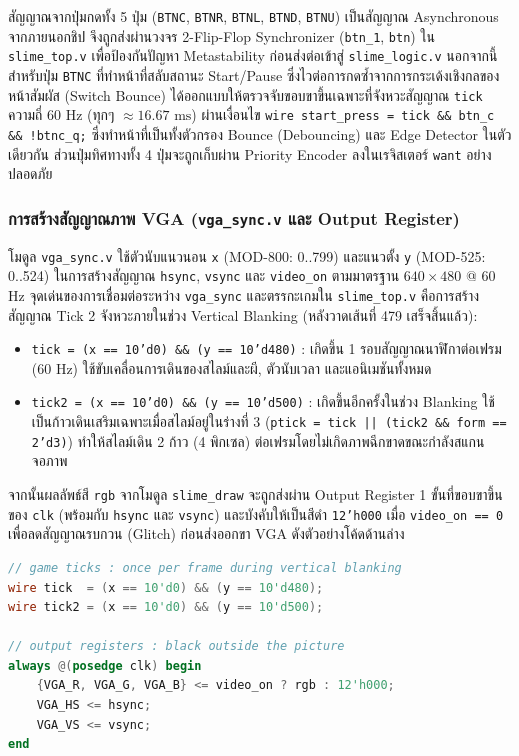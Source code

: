 \documentclass[12pt,a4paper]{article}
\begin{document}
สัญญาณจากปุ่มกดทั้ง 5 ปุ่ม (\texttt{BTNC}, \texttt{BTNR}, \texttt{BTNL}, \texttt{BTND}, \texttt{BTNU}) เป็นสัญญาณ Asynchronous จากภายนอกชิป จึงถูกส่งผ่านวงจร 2-Flip-Flop Synchronizer (\texttt{btn\_1}, \texttt{btn}) ใน \texttt{slime\_top.v} เพื่อป้องกันปัญหา Metastability ก่อนส่งต่อเข้าสู่ \texttt{slime\_logic.v} นอกจากนี้ สำหรับปุ่ม \texttt{BTNC} ที่ทำหน้าที่สลับสถานะ Start/Pause ซึ่งไวต่อการกดซ้ำจากการกระเด้งเชิงกลของหน้าสัมผัส (Switch Bounce) ได้ออกแบบให้ตรวจจับขอบขาขึ้นเฉพาะที่จังหวะสัญญาณ \texttt{tick} ความถี่ 60 Hz (ทุกๆ $\approx 16.67\text{ ms}$) ผ่านเงื่อนไข \texttt{wire start\_press = tick \&\& btn\_c \&\& !btnc\_q;} ซึ่งทำหน้าที่เป็นทั้งตัวกรอง Bounce (Debouncing) และ Edge Detector ในตัวเดียวกัน ส่วนปุ่มทิศทางทั้ง 4 ปุ่มจะถูกเก็บผ่าน Priority Encoder ลงในเรจิสเตอร์ \texttt{want} อย่างปลอดภัย

\subsubsection{การสร้างสัญญาณภาพ VGA (\texttt{vga\_sync.v} และ Output Register)}

โมดูล \texttt{vga\_sync.v} ใช้ตัวนับแนวนอน \texttt{x} (MOD-800: 0..799) และแนวตั้ง \texttt{y} (MOD-525: 0..524) ในการสร้างสัญญาณ \texttt{hsync}, \texttt{vsync} และ \texttt{video\_on} ตามมาตรฐาน $640\times480$ @ 60 Hz จุดเด่นของการเชื่อมต่อระหว่าง \texttt{vga\_sync} และตรรกะเกมใน \texttt{slime\_top.v} คือการสร้างสัญญาณ Tick 2 จังหวะภายในช่วง Vertical Blanking (หลังวาดเส้นที่ 479 เสร็จสิ้นแล้ว):
\begin{itemize}[leftmargin=1.5cm]
    \item \texttt{tick = (x == 10'd0) \&\& (y == 10'd480)} : เกิดขึ้น 1 รอบสัญญาณนาฬิกาต่อเฟรม (60 Hz) ใช้ขับเคลื่อนการเดินของสไลม์และผี, ตัวนับเวลา และแอนิเมชันทั้งหมด
    \item \texttt{tick2 = (x == 10'd0) \&\& (y == 10'd500)} : เกิดขึ้นอีกครั้งในช่วง Blanking ใช้เป็นก้าวเดินเสริมเฉพาะเมื่อสไลม์อยู่ในร่างที่ 3 (\texttt{ptick = tick || (tick2 \&\& form == 2'd3)}) ทำให้สไลม์เดิน 2 ก้าว (4 พิกเซล) ต่อเฟรมโดยไม่เกิดภาพฉีกขาดขณะกำลังสแกนจอภาพ
\end{itemize}
จากนั้นผลลัพธ์สี \texttt{rgb} จากโมดูล \texttt{slime\_draw} จะถูกส่งผ่าน Output Register 1 ขั้นที่ขอบขาขึ้นของ \texttt{clk} (พร้อมกับ \texttt{hsync} และ \texttt{vsync}) และบังคับให้เป็นสีดำ \texttt{12'h000} เมื่อ \texttt{video\_on == 0} เพื่อลดสัญญาณรบกวน (Glitch) ก่อนส่งออกขา VGA ดังตัวอย่างโค้ดด้านล่าง

\begin{lstlisting}[language=Verilog, caption={การสร้างสัญญาณ tick/tick2 และ Output Register ภายใน slime\_top.v}]
// game ticks : once per frame during vertical blanking
wire tick  = (x == 10'd0) && (y == 10'd480);
wire tick2 = (x == 10'd0) && (y == 10'd500);

// output registers : black outside the picture
always @(posedge clk) begin
    {VGA_R, VGA_G, VGA_B} <= video_on ? rgb : 12'h000;
    VGA_HS <= hsync;
    VGA_VS <= vsync;
end
\end{lstlisting}
\end{document}
